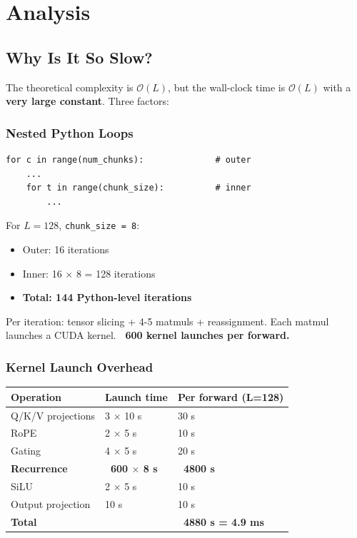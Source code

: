 
\section{Analysis}

\subsection{Why Is It So Slow?}

The theoretical complexity is $\mathcal{O}(L)$, but the wall-clock time is 
$\mathcal{O}(L)$ with a \textbf{very large constant}. Three factors:

\subsubsection{Nested Python Loops}

\begin{lstlisting}
for c in range(num_chunks):              # outer
    ...
    for t in range(chunk_size):          # inner
        ...
\end{lstlisting}

For $L = 128$, \texttt{chunk\_size = 8}:
\begin{itemize}
\item Outer: 16 iterations
\item Inner: 16 $\times$ 8 = 128 iterations
\item \textbf{Total: 144 Python-level iterations}

\end{itemize}
Per iteration: tensor slicing + 4-5 matmuls + reassignment. Each matmul 
launches a CUDA kernel. \textbf{~600 kernel launches per forward.}

\subsubsection{Kernel Launch Overhead}

\begin{table}[H]
\centering
\small
\begin{tabular}{lll}
\toprule
\textbf{Operation} & \textbf{Launch time} & \textbf{Per forward (L=128)} \\
\midrule
Q/K/V projections & 3 $\times$ 10  s & 30  s \\
RoPE & 2 $\times$ 5  s & 10  s \\
Gating & 4 $\times$ 5  s & 20  s \\
\textbf{Recurrence} & \textbf{~600 $\times$ 8  s} & \textbf{~4800  s} \\
SiLU & 2 $\times$ 5  s & 10  s \\
Output projection & 10  s & 10  s \\
\textbf{Total} &  & \textbf{~4880  s = 4.9 ms} \\
\bottomrule
\end{tabular}
\end{table}


